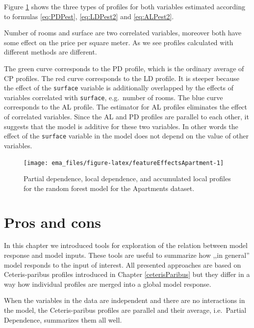 \documentclass[]{krantz}
\begin{document}
Figure \ref{fig:featureEffectsApartment} shows the three types of profiles for both variables estimated according to formulas \eqref{eq:PDPest}, \eqref{eq:LDPest2} and \eqref{eq:ALPest2}.

Number of rooms and surface are two correlated variables, moreover both have some effect on the price per square meter. As we see profiles calculated with different methods are different.

The green curve corresponds to the PD profile, which is the ordinary average of CP profiles. The red curve corresponds to the LD profile. It is steeper because the effect of the \texttt{surface} variable is additionally overlapped by the effects of variables correlated with \texttt{surface}, e.g.~number of rooms.
The blue curve corresponds to the AL profile. The estimator for AL profiles eliminates the effect of correlated variables. Since the AL and PD profiles are parallel to each other, it suggests that the model is additive for these two variables. In other words the effect of the \texttt{surface} variable in the model does not depend on the value of other variables.

\begin{figure}

{\centering \texttt{[image: ema\_files/figure-latex/featureEffectsApartment-1]} 

}

\caption{Partial dependence, local dependence, and accumulated local profiles for the random forest model for the  Apartments dataset.}\label{fig:featureEffectsApartment}
\end{figure}

\hypertarget{ALPProsCons}{%
\section{Pros and cons}\label{ALPProsCons}}

In this chapter we introduced tools for exploration of the relation between model response and model inputs. These tools are useful to summarize how ,,in general'' model responds to the input of interest. All presented approaches are based on Ceteris-paribus profiles introduced in Chapter \ref{ceterisParibus} but they differ in a way how individual profiles are merged into a global model response.

When the variables in the data are independent and there are no interactions in the model, the Ceteris-paribus profiles are parallel and their average, i.e.~Partial Dependence, summarizes them all well.
\end{document}
